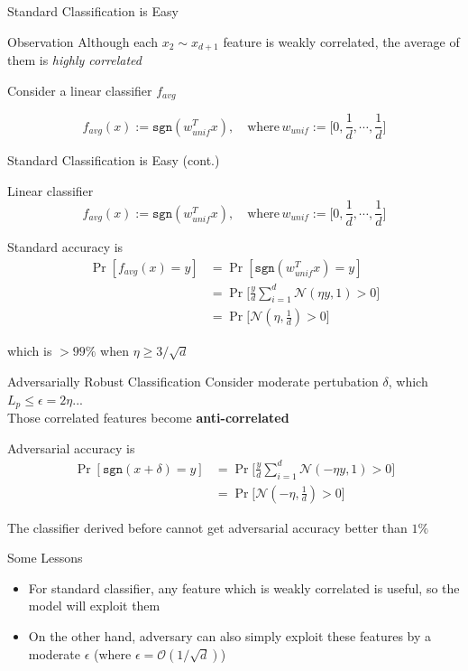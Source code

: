 \documentclass{beamer}
\begin{document}
\begin{frame}{Standard Classification is Easy}
  \begin{block}{Observation}
    Although each $x_2 \sim x_{d+1}$ feature is weakly correlated, the average of them is \textit{highly correlated} 
  \end{block}
  Consider a linear classifier $f_{avg}$

  \[
    f_{avg}(x) := \texttt{sgn}(w_{unif}^T x), \quad \text{where} \, w_{unif}:= \Big[0,\frac{1}{d},\cdots,\frac{1}{d}\Big]
  \]

\end{frame}

\begin{frame}{Standard Classification is Easy (cont.)}
  \begin{block}{Linear classifier}
  \[
    f_{avg}(x) := \texttt{sgn}(w_{unif}^T x), \quad \text{where} \, w_{unif}:= \Big[0,\frac{1}{d},\cdots,\frac{1}{d}\Big]
  \]
  \end{block}
  Standard accuracy is 
    \begin{align*}
      \Pr[f_{avg}(x) = y] &= \Pr[\texttt{sgn}(w_{unif}^T x) = y]  \\
                          &= \Pr \Big[\frac{y}{d}\sum_{i=1}^d \mathcal{N}(\eta y,1) > 0 \Big] \\
                          &= \Pr \Big[\mathcal{N}(\eta,\frac{1}{d}) > 0 \Big]
    \end{align*}

  which is $> 99\%$ when $\eta \geq 3 / \sqrt{d}$
\end{frame}

\begin{frame}{Adversarially Robust Classification}
  Consider moderate pertubation $\delta$, which $L_p \leq \epsilon = 2 \eta$...\\
  Those correlated features become \textbf{anti-correlated}

  Adversarial accuracy is
    \begin{align*}
      \Pr[\texttt{sgn}(x + \delta) = y] &= \Pr \Big[\frac{y}{d}\sum_{i=1}^d \mathcal{N}(-\eta y,1) > 0 \Big] \\
                                &= \Pr \Big[\mathcal{N}(-\eta,\frac{1}{d}) > 0 \Big]
    \end{align*}

  The classifier derived before cannot get adversarial accuracy better than $1\%$
\end{frame}

\begin{frame}{Some Lessons}
  \begin{itemize}
    \item For standard classifier, any feature which is weakly correlated is useful, so the model will exploit them
    \item On the other hand, adversary can also simply exploit these features by a moderate $\epsilon$ (where $\epsilon = \mathcal{O}(1/\sqrt{d})$)
  \end{itemize}
\end{frame}
\end{document}
